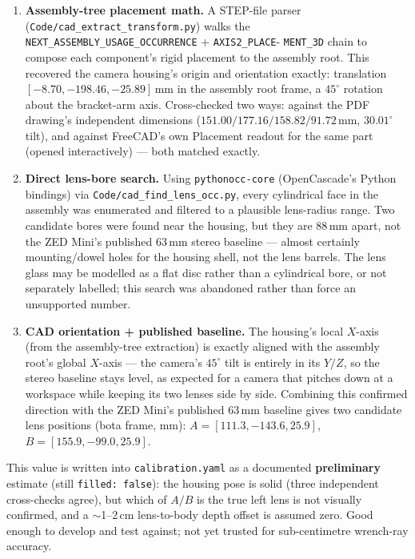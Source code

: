 \documentclass[11pt]{article}
\begin{document}
\begin{enumerate}[noitemsep]
  \item \textbf{Assembly-tree placement math.} A STEP-file parser
        (\texttt{Code/cad\_extract\_transform.py}) walks the
        \texttt{NEXT\_ASSEMBLY\_USAGE\_OCCURRENCE} + \texttt{AXIS2\_PLACE}-
        \texttt{MENT\_3D} chain to compose each component's rigid placement
        to the assembly root. This recovered the camera housing's origin and
        orientation exactly: translation $[-8.70,-198.46,-25.89]$\,mm in the
        assembly root frame, a $45^\circ$ rotation about the bracket-arm
        axis. Cross-checked two ways: against the PDF drawing's independent
        dimensions ($151.00/177.16/158.82/91.72$\,mm, $30.01^\circ$ tilt),
        and against FreeCAD's own Placement readout for the same part
        (opened interactively) --- both matched exactly.
  \item \textbf{Direct lens-bore search.} Using \texttt{pythonocc-core}
        (OpenCascade's Python bindings) via
        \texttt{Code/cad\_find\_lens\_occ.py}, every cylindrical face in the
        assembly was enumerated and filtered to a plausible lens-radius
        range. Two candidate bores were found near the housing, but they
        are $88$\,mm apart, not the ZED Mini's published $63$\,mm stereo
        baseline --- almost certainly mounting/dowel holes for the housing
        shell, not the lens barrels. The lens glass may be modelled as a
        flat disc rather than a cylindrical bore, or not separately
        labelled; this search was abandoned rather than force an
        unsupported number.
  \item \textbf{CAD orientation + published baseline.} The housing's local
        $X$-axis (from the assembly-tree extraction) is exactly aligned with
        the assembly root's global $X$-axis --- the camera's $45^\circ$ tilt
        is entirely in its $Y/Z$, so the stereo baseline stays level, as
        expected for a camera that pitches down at a workspace while
        keeping its two lenses side by side. Combining this confirmed
        direction with the ZED Mini's published $63$\,mm baseline gives two
        candidate lens positions (bota frame, mm): $A=[111.3,-143.6,25.9]$,
        $B=[155.9,-99.0,25.9]$.
\end{enumerate}

This value is written into \texttt{calibration.yaml} as a documented
\textbf{preliminary} estimate (still \texttt{filled: false}): the housing
pose is solid (three independent cross-checks agree), but which of $A/B$ is
the true left lens is not visually confirmed, and a $\sim$1--2\,cm
lens-to-body depth offset is assumed zero. Good enough to develop and test
against; not yet trusted for sub-centimetre wrench-ray accuracy.
\end{document}
